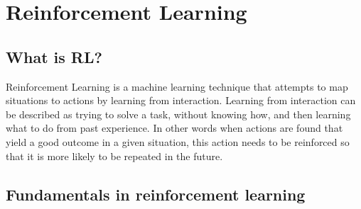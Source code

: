 \documentclass[11pt]{article}
\begin{document}
\maketitle

\section{Reinforcement Learning}


\subsection{What is RL?}

Reinforcement Learning is a machine learning technique that attempts to map situations to actions by learning from interaction. Learning from interaction can be described as trying to solve a task, without knowing how, and then learning what to do from past experience.  In other words when actions are found that yield a good outcome in a given situation, this action needs to be reinforced so that it is more likely to be repeated in the future.


\subsection{Fundamentals in reinforcement learning}
\end{document}
